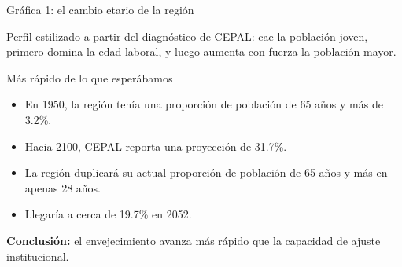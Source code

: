 \documentclass{beamer}
\begin{document}
\begin{frame}{Gráfica 1: el cambio etario de la región}
\centering
{}

\vspace{0.2cm}
\small
Perfil estilizado a partir del diagnóstico de CEPAL: cae la población joven, primero domina la edad laboral, y luego aumenta con fuerza la población mayor.
\end{frame}

\begin{frame}{Más rápido de lo que esperábamos}
\begin{itemize}
    \item En 1950, la región tenía una proporción de población de 65 años y más de 3.2\%.
    \item Hacia 2100, CEPAL reporta una proyección de 31.7\%.
    \item La región duplicará su actual proporción de población de 65 años y más en apenas 28 años.
    \item Llegaría a cerca de 19.7\% en 2052.
\end{itemize}

\vspace{0.3cm}
\textbf{Conclusión:} el envejecimiento avanza más rápido que la capacidad de ajuste institucional.
\end{frame}
\end{document}
